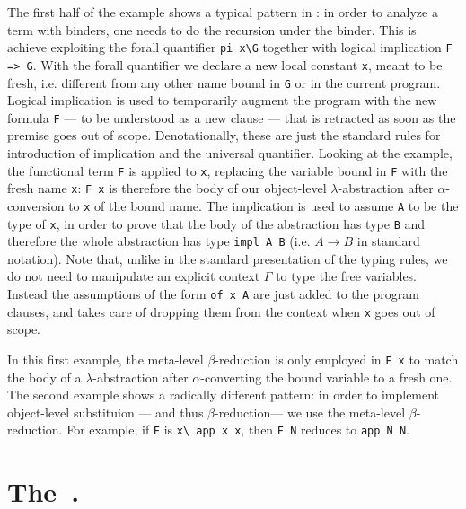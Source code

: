 \documentclass{llncs}
\begin{document}
The first half of the example shows a typical pattern in \lp: in order to analyze a term with binders, one needs to do the recursion under the binder. This is achieve exploiting the forall quantifier \verb+pi x\G+ together with logical
implication \verb+F => G+. With the forall quantifier we declare a new local constant \verb+x+, meant to be fresh, i.e. different from any other name bound in \verb+G+ or in the current program. Logical implication is used to temporarily augment the program with the new formula \verb+F+ --- to be understood as a new clause --- that is retracted as soon as the premise goes out of scope. Denotationally, these are just the standard rules for introduction of implication and the universal quantifier. Looking at the example, the functional term \verb+F+ is applied to \verb+x+, replacing the variable bound in \verb+F+ with the fresh name \verb+x+: \verb+F x+ is therefore the body of our object-level $\lambda$-abstraction after $\alpha$-conversion to \verb+x+ of the bound name. The implication is used to assume \verb+A+ to be the type of \verb+x+, in order to prove that the body of the abstraction has type \verb+B+ and therefore the whole abstraction has type \verb+impl A B+ (i.e. $A \to B$ in standard notation). Note that, unlike in the standard presentation of the typing rules, we do not need to manipulate an explicit context $\Gamma$ to type the free variables. Instead the assumptions of the form \verb+of x A+ are just added to the program clauses, and \lp{} takes care of dropping them from the context when \verb+x+ goes out of scope.

In this first example, the meta-level $\beta$-reduction is only employed in \verb+F x+ to match the body of a $\lambda$-abstraction after $\alpha$-converting the bound variable to a fresh one. The second example shows a radically different pattern: in order to implement object-level substituion --- and thus $\beta$-reduction--- we use the meta-level $\beta$-reduction. For example, if
\verb+F+ is \verb+x\ app x x+, then \verb+F N+ reduces to \verb+app N N+.

\section{The~\frag.}

\end{document}
